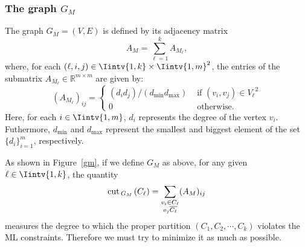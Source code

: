\subsubsection*{The graph $G_M$}
\begin{definition}
   The graph $G_M = (V,E)$ is defined by its adjacency matrix 
   \begin{equation}\label{am}
   A_M = \sum_{\ell = 1}^k A_{M_{\ell}},
\end{equation}
   where, for each $(\ell, i, j) \in \Iintv{1,k} \times \Iintv{1, m}^2$, the entries of the submatrix $A_{M_{\ell}} \in \mathbb R^{m \times m}$ are given by:
   \begin{equation}
      (A_{M_{\ell}})_{ij} =
      \begin{cases}
         (d_i d_j) / (d_{\min} d_{\max}) & \text{ if $(v_i, v_j) \in {V_{\ell}}^2$} \\
         0 & \text{ otherwise.}
      \end{cases}
   \end{equation}
   Here, for each $i \in \Iintv{1,m}$, $d_i$ represents the degree of the vertex $v_i$. 
   Futhermore, $d_{\min}$ and $d_{\max}$ represent the smallest and biggest element of the set $\{ d_i \}_{i=1}^m$, respectively.
\end{definition}

As shown in Figure~\vref{gm}, if we define $G_M$ as above, for any given $\ell \in \Iintv{1,k}$, the quantity
\begin{equation}
   \operatorname{cut\,}_{G_M\,}(C_{\ell}) = \sum_{\substack{v_i \in C_{\ell} \\ v_j \overline{C_{\ell}}}} (A_M)_{ij} 
\end{equation}
measures the degree to which the proper partition $(C_1, C_2, \cdots, C_k)$ violates the ML constraints.
Therefore we must try to minimize it as much as possible.

